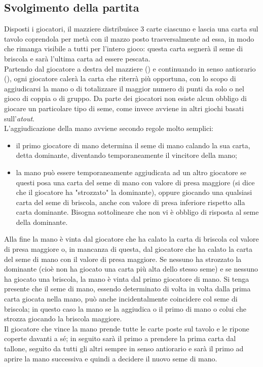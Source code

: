 \subsection{Svolgimento della partita}

Disposti i giocatori, il mazziere distribuisce 3 carte ciascuno e lascia una carta sul tavolo coprendola per metà con il mazzo posto trasversalmente ad essa, in modo che rimanga visibile a tutti per l'intero gioco: questa carta segnerà il seme di briscola e sarà l'ultima carta ad essere pescata.\\
Partendo dal giocatore a destra del mazziere (\cite{giochidicarte}) e continuando in senso antiorario (\cite{giochidicarte2}), ogni giocatore calerà la carta che riterrà più opportuna, con lo scopo di aggiudicarsi la mano o di totalizzare il maggior numero di punti da solo o nel gioco di coppia o di gruppo. Da parte dei giocatori non esiste alcun obbligo di giocare un particolare tipo di seme, come invece avviene in altri giochi basati sull'\emph{atout}.\\

L'aggiudicazione della mano avviene secondo regole molto semplici:

\begin{itemize}
   \item il primo giocatore di mano determina il seme di mano calando la sua carta, detta dominante, diventando temporaneamente il vincitore della mano;
   \item la mano può essere temporaneamente aggiudicata ad un altro giocatore se questi posa una carta del seme di mano con valore di presa maggiore (si dice che il giocatore ha "strozzato" la dominante), oppure giocando una qualsiasi carta del seme di briscola, anche con valore di presa inferiore rispetto alla carta dominante. Bisogna sottolineare che non vi è obbligo di risposta al seme della dominante.
\end{itemize}
Alla fine la mano è vinta dal giocatore che ha calato la carta di briscola col valore di presa maggiore o, in mancanza di questa, dal giocatore che ha calato la carta del seme di mano con il valore di presa maggiore. Se nessuno ha strozzato la dominante (cioè non ha giocato una carta più alta dello stesso seme) e se nessuno ha giocato una briscola, la mano è vinta dal primo giocatore di mano. Si tenga presente che il seme di mano, essendo determinato di volta in volta dalla prima carta giocata nella mano, può anche incidentalmente coincidere col seme di briscola; in questo caso la mano se la aggiudica o il primo di mano o colui che strozza giocando la briscola maggiore.\\
Il giocatore che vince la mano prende tutte le carte poste sul tavolo e le ripone coperte davanti a sé; in seguito sarà il primo a prendere la prima carta dal tallone, seguìto da tutti gli altri sempre in senso antiorario e sarà il primo ad aprire la mano successiva e quindi a decidere il nuovo seme di mano.

